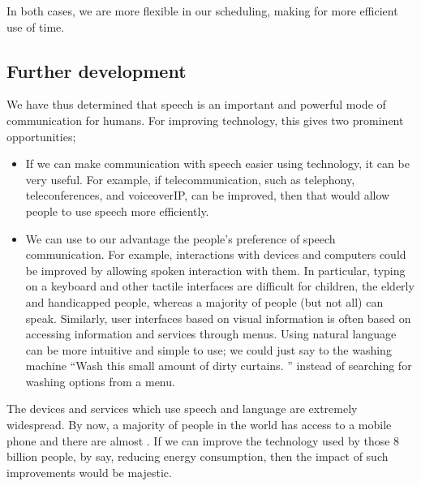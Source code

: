 \documentclass[letterpaper,10pt,english]{jupyterBook}
\begin{document}
\sphinxAtStartPar
In both cases, we are more flexible in our scheduling, making for more
efficient use of time.

\sphinxAtStartPar
{}


\subsection{Further development}
\label{\detokenize{Introduction/Why_speech_processing:further-development}}
\sphinxAtStartPar
We have thus determined that speech is an important and powerful mode of
communication for humans. For improving technology, this gives two
prominent opportunities;
\begin{itemize}
\item {} 
\sphinxAtStartPar
If we can make communication with speech easier using technology, it
can be very useful. For example, if telecommunication, such as
telephony, teleconferences, and voice\sphinxhyphen{}over\sphinxhyphen{}IP, can be improved, then
that would allow people to use speech more efficiently.

\item {} 
\sphinxAtStartPar
We can use to our advantage the people’s preference of speech
communication. For example, interactions with devices and computers
could be improved by allowing spoken interaction with them. In
particular, typing on a keyboard and other tactile interfaces are
difficult for children, the elderly and handicapped people, whereas
a majority of people (but not all) can speak. Similarly, user
interfaces based on visual information is often based on accessing
information and services through menus. Using natural language can
be more intuitive and simple to use; we could just say to the
washing machine “Wash this small amount of dirty curtains. ” instead
of searching for washing options from a menu.

\end{itemize}

\sphinxAtStartPar
The devices and services which use speech and language are extremely
wide\sphinxhyphen{}spread. By now, a majority of people in the world has access to a
mobile phone and there are almost . If we
can improve the technology used by those 8 billion people, by say,
reducing energy consumption, then the impact of such improvements would
be majestic.

\sphinxstepscope
\end{document}
